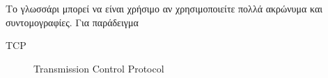 \begin{Glossary}
Το γλωσσάρι μπορεί να είναι χρήσιμο αν χρησιμοποιείτε πολλά ακρώνυμα
και συντομογραφίες. Για παράδειγμα
\begin{description}
\item[TCP]Transmission Control Protocol
\end{description}
\end{Glossary}